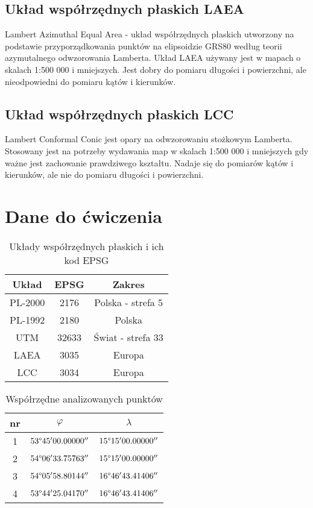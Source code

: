\documentclass[fleqn,10pt,a4paper]{article}
\begin{document}
\subsection{Układ współrzędnych płaskich LAEA}
Lambert Azimuthal Equal Area - układ współrzędnych płaskich utworzony na podstawie przyporządkowania punktów na elipsoidzie
GRS80 według teorii azymutalnego odwzorowania Lamberta.
Układ LAEA używany jest w mapach o skalach 1:500 000 i mniejszych. Jest dobry do pomiaru długości i powierzchni, 
ale nieodpowiedni do pomiaru kątów i kierunków.

\subsection{Układ współrzędnych płaskich LCC}
Lambert Conformal Conic jest opary na odwzorowaniu stożkowym Lamberta. Stosowany jest na potrzeby wydawania map w skalach 1:500 000 i mniejszych
gdy ważne jest zachowanie prawdziwego kształtu. Nadaje się do pomiarów kątów i kierunków, ale nie do pomiaru długości i powierzchni.

\section{Dane do ćwiczenia}
\vspace*{1cm}

\begin{table}[!ht]
  \centering
  \begin{tabular}{|c|c|c|}
    \hline
    Układ      & EPSG  & Zakres             \\ \hline
    PL-2000    & 2176  & Polska - strefa 5  \\
    PL-1992    & 2180  & Polska             \\
    UTM        & 32633 & Świat - strefa 33 \\
    LAEA       & 3035  & Europa             \\
    LCC        & 3034  & Europa             \\
    \hline
  \end{tabular}
  \caption{Układy współrzędnych płaskich i ich kod EPSG
  \label{tab:uklady}}
\end{table}

\begin{table}[!ht]
  \centering
  \begin{tabular}{|c|c|c|}
    \hline
    nr & $\varphi$                  & $\lambda$                  \\ \hline
    1  & $53\degree 45' 00.00000''$ & $15\degree 15' 00.00000''$ \\
    2  & $54\degree 06' 33.75763''$ & $15\degree 15' 00.00000''$ \\
    3  & $54\degree 05' 58.80144''$ & $16\degree 46' 43.41406''$ \\
    4  & $53\degree 44' 25.04170''$ & $16\degree 46' 43.41406''$ \\
    \hline
  \end{tabular}
  \caption{Współrzędne analizowanych punktów
    \label{tab:punkty}}
\end{table}
\end{document}

